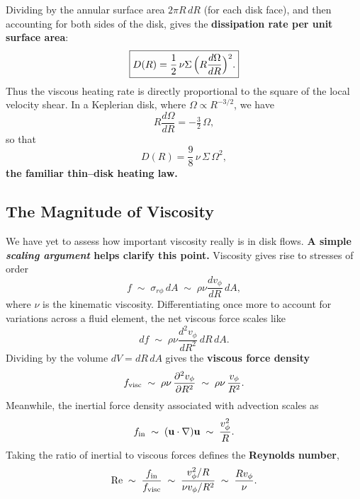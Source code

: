 \medskip
Dividing by the annular surface area $2\pi R\,dR$ (for each disk face), 
and then accounting for both sides of the disk, gives the \textbf{dissipation rate per unit surface area}:
\begin{equation}
    \label{eq:disk_dissipation_per_unit_area}
    \boxed{D(R) = \frac{1}{2}\,\nu \Sigma \,\Bigl(R \frac{d\Omega}{dR}\Bigr)^2.}
\end{equation}
\medskip
Thus the viscous heating rate is directly proportional to the square of the local velocity shear. 
In a Keplerian disk, where $\Omega \propto R^{-3/2}$, we have
\begin{equation}
R \frac{d\Omega}{dR} = -\tfrac{3}{2}\,\Omega,
\end{equation}
so that
\begin{equation}
\label{eq:keplerian_disk_heating_law}
\boxed{
D(R) = \frac{9}{8}\,\nu\,\Sigma\,\Omega^2,}
\end{equation}
\textbf{the familiar thin--disk heating law.}

\subsection{The Magnitude of Viscosity}

We have yet to assess how important viscosity really is in disk flows.  \textbf{A simple \emph{scaling argument} helps clarify this point.}
\medskip
\noindent
Viscosity gives rise to stresses of order
\begin{equation}
f \;\sim\; \sigma_{r\phi}\, dA \;\sim\; \rho \nu \frac{dv_\phi}{dR}\, dA ,
\end{equation}
where $\nu$ is the kinematic viscosity.  
Differentiating once more to account for variations across a fluid element, the net viscous force scales like
\begin{equation}
df \;\sim\; \rho \nu \frac{d^2 v_\phi}{dR^2}\, dR\, dA .
\end{equation}
Dividing by the volume $dV = dR\,dA$ gives the \textbf{viscous force density}
\begin{equation}
f_{\rm visc} \;\sim\; \rho \nu \,\frac{\partial^2 v_\phi}{\partial R^2}
                 \;\sim\; \rho \nu \,\frac{v_\phi}{R^2}.
\end{equation}
\medskip
\noindent
Meanwhile, the inertial force density associated with advection scales as
\begin{equation}
f_{\rm in} \;\sim\; (\mathbf{u}\cdot\nabla)\mathbf{u}
              \;\sim\; \frac{v_\phi^2}{R}.
\end{equation}
\medskip
\noindent
Taking the ratio of inertial to viscous forces defines the 
\textbf{Reynolds number},
\begin{equation}
{\rm Re} \;\sim\; \frac{f_{\rm in}}{f_{\rm visc}}
        \;\sim\; \frac{v_\phi^2/R}{\nu v_\phi/R^2}
        \;\sim\; \frac{R v_\phi}{\nu}.
\end{equation}

